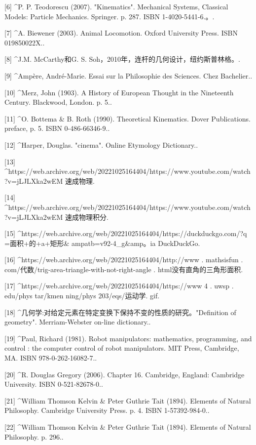 [6]
^P. P. Teodorescu (2007). "Kinematics". Mechanical Systems, Classical Models: Particle Mechanics. Springer. p. 287. ISBN 1-4020-5441-6.。.

[7]
^A. Biewener (2003). Animal Locomotion. Oxford University Press. ISBN 019850022X..

[8]
^J.M. McCarthy和G. S. Soh，2010年，连杆的几何设计，纽约斯普林格。.

[9]
^Ampère, André-Marie. Essai sur la Philosophie des Sciences. Chez Bachelier..

[10]
^Merz, John (1903). A History of European Thought in the Nineteenth Century. Blackwood, London. p. 5..

[11]
^O. Bottema & B. Roth (1990). Theoretical Kinematics. Dover Publications. preface, p. 5. ISBN 0-486-66346-9..

[12]
^Harper, Douglas. "cinema". Online Etymology Dictionary..

[13]
^https://web.archive.org/web/20221025164404/https://www.youtube.com/watch?v=jLJLXka2wEM 速成物理.

[14]
^https://web.archive.org/web/20221025164404/https://www.youtube.com/watch?v=jLJLXka2wEM 速成物理积分.

[15]
^https://web.archive.org/web/20221025164404/https://duckduckgo.com/?q =面积+的+a+矩形& ampatb=v92-4_g&amp。ia DuckDuckGo.

[16]
^https://web.archive.org/web/20221025164404/http://www . mathsisfun . com/代数/trig-area-triangle-with-not-right-angle . html没有直角的三角形面积.

[17]
^https://web.archive.org/web/20221025164404/https://www 4 . uwsp . edu/phys tar/kmen ning/phys 203/eqs/运动学. gif.

[18]
^几何学:对给定元素在特定变换下保持不变的性质的研究。"Definition of geometry". Merriam-Webster on-line dictionary..

[19]
^Paul, Richard (1981). Robot manipulators: mathematics, programming, and control : the computer control of robot manipulators. MIT Press, Cambridge, MA. ISBN 978-0-262-16082-7..

[20]
^R. Douglas Gregory (2006). Chapter 16. Cambridge, England: Cambridge University. ISBN 0-521-82678-0..

[21]
^William Thomson Kelvin & Peter Guthrie Tait (1894). Elements of Natural Philosophy. Cambridge University Press. p. 4. ISBN 1-57392-984-0..

[22]
^William Thomson Kelvin & Peter Guthrie Tait (1894). Elements of Natural Philosophy. p. 296..

